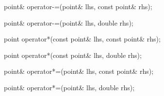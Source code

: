 %
%
\begin{itemdecl}
point& operator-=(point& lhs, const point& rhs);
\end{itemdecl}
\begin{itemdescr}
	\pnum
	\effects

	\pnum
	\returns
\end{itemdescr}

%
%
\begin{itemdecl}
point& operator-=(point& lhs, double rhs);
\end{itemdecl}
\begin{itemdescr}
	\pnum
	\effects

	\pnum
	\returns
\end{itemdescr}

%
%
\begin{itemdecl}
point operator*(const point& lhs, const point& rhs);
\end{itemdecl}
\begin{itemdescr}
	\pnum
	\returns
\end{itemdescr}

%
%
\begin{itemdecl}
point operator*(const point& lhs, double rhs);
\end{itemdecl}
\begin{itemdescr}
	\pnum
	\returns
\end{itemdescr}

%
%
\begin{itemdecl}
point& operator*=(point& lhs, const point& rhs);
\end{itemdecl}
\begin{itemdescr}
	\pnum
	\effects

	\pnum
	\returns
\end{itemdescr}

%
%
\begin{itemdecl}
point& operator*=(point& lhs, double rhs);
\end{itemdecl}
\begin{itemdescr}
	\pnum
	\effects

	\pnum
	\returns
\end{itemdescr}

